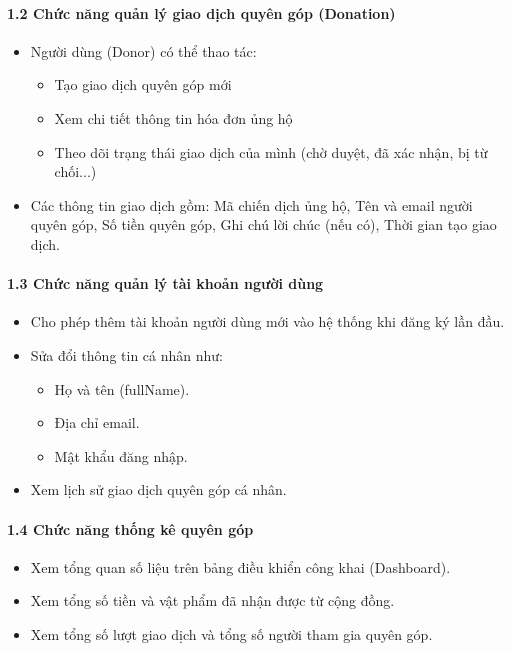 \documentclass[12pt,a4paper]{article}
\begin{document}
\paragraph{1.2 Chức năng quản lý giao dịch quyên góp (Donation)} \mbox{} 
\begin{itemize}
    \item Người dùng (Donor) có thể thao tác:
    \begin{itemize}
        \item Tạo giao dịch quyên góp mới
        \item Xem chi tiết thông tin hóa đơn ủng hộ
        \item Theo dõi trạng thái giao dịch của mình (chờ duyệt, đã xác nhận, bị từ chối...)
    \end{itemize}
    \item Các thông tin giao dịch gồm: Mã chiến dịch ủng hộ, Tên và email người quyên góp, Số tiền quyên góp, Ghi chú lời chúc (nếu có), Thời gian tạo giao dịch.
\end{itemize}
\paragraph{1.3 Chức năng quản lý tài khoản người dùng} \mbox{} 

\begin{itemize}
    \item Cho phép thêm tài khoản người dùng mới vào hệ thống khi đăng ký lần đầu.
    \item Sửa đổi thông tin cá nhân như:
    \begin{itemize}    
        \item Họ và tên (fullName).
        \item Địa chỉ email.
        \item Mật khẩu đăng nhập. 
    \end{itemize}
    \item Xem lịch sử giao dịch quyên góp cá nhân.
\end{itemize}

\paragraph{1.4 Chức năng thống kê quyên góp} \mbox{} 

\begin{itemize} 
    \item Xem tổng quan số liệu trên bảng điều khiển công khai (Dashboard).
    \item Xem tổng số tiền và vật phẩm đã nhận được từ cộng đồng.
    \item Xem tổng số lượt giao dịch và tổng số người tham gia quyên góp.
\end{itemize}
\end{document}
